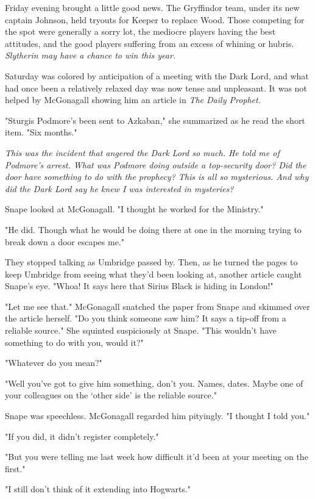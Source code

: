 Friday evening brought a little good news. The Gryffindor team, under its new captain Johnson, held tryouts for Keeper to replace Wood. Those competing for the spot were generally a sorry lot, the mediocre players having the best attitudes, and the good players suffering from an excess of whining or hubris. \emph{Slytherin may have a chance to win this year.}

Saturday was colored by anticipation of a meeting with the Dark Lord, and what had once been a relatively relaxed day was now tense and unpleasant. It was not helped by McGonagall showing him an article in \emph{The Daily Prophet.}

"Sturgis Podmore's been sent to Azkaban," she summarized as he read the short item. "Six months."

\emph{This was the incident that angered the Dark Lord so much. He told me of Podmore's arrest. What was Podmore doing outside a top-security door? Did the door have something to do with the prophecy? This is all so mysterious. And why did the Dark Lord say he knew I was interested in mysteries?}

Snape looked at McGonagall. "I thought he worked for the Ministry."

"He did. Though what he would be doing there at one in the morning trying to break down a door escapes me."

They stopped talking as Umbridge passed by. Then, as he turned the pages to keep Umbridge from seeing what they'd been looking at, another article caught Snape's eye. "Whoa! It says here that Sirius Black is hiding in London!"

"Let me see that." McGonagall snatched the paper from Snape and skimmed over the article herself. "Do you think someone saw him? It says a tip-off from a reliable source." She squinted suspiciously at Snape. "This wouldn't have something to do with you, would it?"

"Whatever do you mean?"

"Well you've got to give him something, don't you. Names, dates. Maybe one of your colleagues on the `other side' is the reliable source."

Snape was speechless. McGonagall regarded him pityingly. "I thought I told you."

"If you did, it didn't register completely."

"But you were telling me last week how difficult it'd been at your meeting on the first."

"I still don't think of it extending into Hogwarts."

